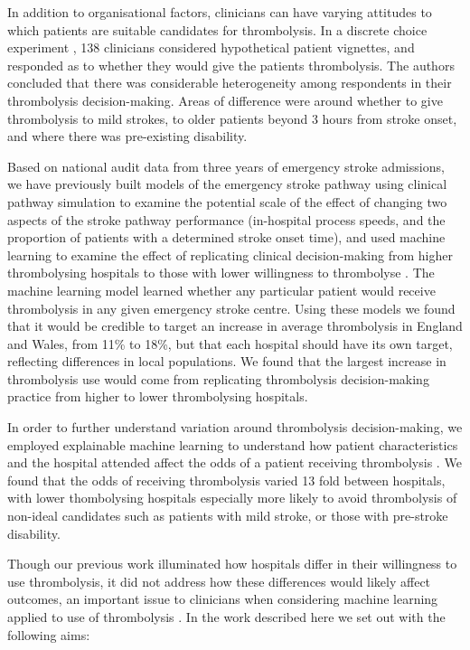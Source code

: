 In addition to organisational factors, clinicians can have varying attitudes to which patients are suitable candidates for thrombolysis. In a discrete choice experiment \cite{de_brun_factors_2018}, 138 clinicians considered hypothetical patient vignettes, and responded as to whether they would give the patients thrombolysis. The authors concluded that there was considerable heterogeneity among respondents in their thrombolysis decision-making. Areas of difference were around whether to give thrombolysis to mild strokes, to older patients beyond 3 hours from stroke onset, and where there was pre-existing disability.

Based on national audit data from three years of emergency stroke admissions, we have previously built models of the emergency stroke pathway using clinical pathway simulation to examine the potential scale of the effect of changing two aspects of the stroke pathway performance (in-hospital process speeds, and the proportion of patients with a determined stroke onset time), and used machine learning to examine the effect of replicating clinical decision-making from higher thrombolysing hospitals to those with lower willingness to thrombolyse \cite{allen_use_2022, allen_using_2022}. The machine learning model learned whether any particular patient would receive thrombolysis in any given emergency stroke centre. Using these models we found that it would be credible to target an increase in average thrombolysis in England and Wales, from 11\% to 18\%, but that each hospital should have its own target, reflecting differences in local populations. We found that the largest increase in thrombolysis use would come from replicating thrombolysis decision-making practice from higher to lower thrombolysing hospitals. 

In order to further understand variation around thrombolysis decision-making, we employed explainable machine learning to understand how patient characteristics and the hospital attended affect the odds of a patient receiving thrombolysis \cite{pearn_what_2023}. We found that the odds of receiving thrombolysis varied 13 fold between hospitals, with lower thombolysing hospitals especially more likely to avoid thrombolysis of non-ideal candidates such as patients with mild stroke, or those with pre-stroke disability.


Though our previous work illuminated how hospitals differ in their willingness to use thrombolysis, it did not address how these differences would likely affect outcomes, an important issue to clinicians when considering machine learning applied to use of thrombolysis \cite{allen_using_2022}. In the work described here we set out with the following aims:

